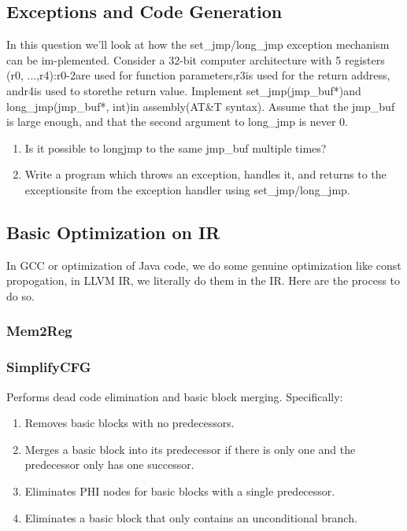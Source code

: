 \documentclass[a4paper]{exam}
\theoremstyle{definition}
\begin{document}
\subsection{Exceptions and Code Generation}
In  this  question  we’ll  look  at  how  the  set\_jmp/long\_jmp  exception  mechanism  can  be  im-plemented.   Consider  a  32-bit  computer  architecture  with  5  registers  (r0,  ...,r4):r0-2are used for function parameters,r3is used for the return address, andr4is used to storethe return value.  Implement set\_jmp(jmp\_buf*)and long\_jmp(jmp\_buf*, int)in assembly(AT\&T syntax).  Assume that the jmp\_buf is large enough, and that the second argument to long\_jmp is never 0.
\begin{solutions}

\end{solutions}
  \begin{enumerate}
    \item  Is it possible to longjmp to the same jmp\_buf multiple times?
    \item  Write a program which throws an exception, handles it, and returns to the exceptionsite from the exception handler using set\_jmp/long\_jmp.
  \end{enumerate}
  \begin{solutions}

  \end{solutions}

\subsection{Basic Optimization on IR}
In GCC or optimization of Java code, we do some genuine optimization like const propogation, in LLVM IR, we literally do them in the IR. Here are the process to do so.

\subsubsection{Mem2Reg}


\subsubsection{SimplifyCFG}
Performs dead code elimination and basic block merging. Specifically:
\begin{enumerate}
  \item Removes basic blocks with no predecessors.
  \item Merges a basic block into its predecessor if there is only one and the predecessor only has one successor.
  \item Eliminates PHI nodes for basic blocks with a single predecessor.
  \item Eliminates a basic block that only contains an unconditional branch.
\end{enumerate}
\end{document}
